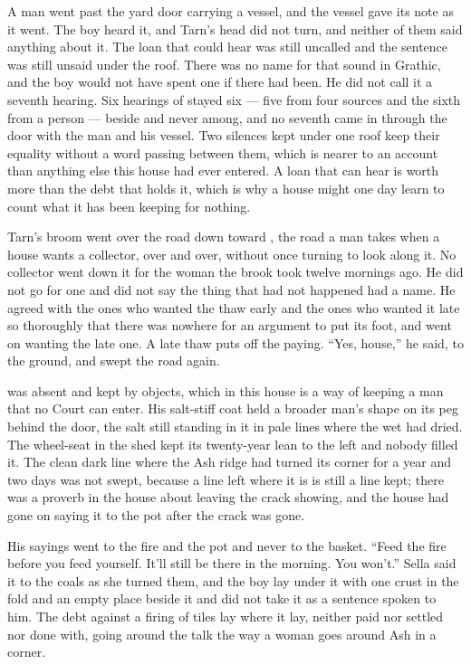 A man went past the yard door carrying a vessel, and the vessel gave its note as it went. The boy heard it, and Tarn's head did not turn, and neither of them said anything about it. The loan that could hear was still uncalled and the sentence was still unsaid under the roof. There was no name for that sound in Grathic, and the boy would not have spent one if there had been. He did not call it a seventh hearing. Six hearings of  stayed six --- five from four sources and the sixth from a person --- beside and never among, and no seventh came in through the door with the man and his vessel. Two silences kept under one roof keep their equality without a word passing between them, which is nearer to an account than anything else this house had ever entered. A loan that can hear is worth more than the debt that holds it, which is why a house might one day learn to count what it has been keeping for nothing.

Tarn's broom went over the road down toward , the road a man takes when a house wants a collector, over and over, without once turning to look along it. No collector went down it for the woman the brook took twelve mornings ago. He did not go for one and did not say the thing that had not happened had a name. He agreed with the ones who wanted the thaw early and the ones who wanted it late so thoroughly that there was nowhere for an argument to put its foot, and went on wanting the late one. A late thaw puts off the paying. “Yes, house,” he said, to the ground, and swept the road again.

\scenebreak

 was absent and kept by objects, which in this house is a way of keeping a man that no Court can enter. His salt-stiff coat held a broader man's shape on its peg behind the door, the salt still standing in it in pale lines where the wet had dried. The wheel-seat in the shed kept its twenty-year lean to the left and nobody filled it. The clean dark line where the Ash ridge had turned its corner for a year and two days was not swept, because a line left where it is is still a line kept; there was a proverb in the house about leaving the crack showing, and the house had gone on saying it to the pot after the crack was gone.

His sayings went to the fire and the pot and never to the basket. “Feed the fire before you feed yourself. It'll still be there in the morning. You won't.” Sella said it to the coals as she turned them, and the boy lay under it with one crust in the fold and an empty place beside it and did not take it as a sentence spoken to him. The debt against a firing of tiles lay where it lay, neither paid nor settled nor done with, going around the talk the way a woman goes around Ash in a corner.

